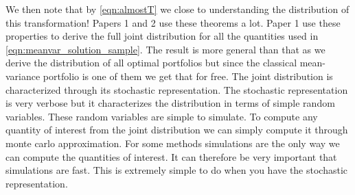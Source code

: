 \documentclass[oneside]{book}\usepackage{knitr}
\begin{document}
We then note that by \eqref{eqn:almostT} we close to understanding the distribution of this transformation! 
Papers 1 and 2 use these theorems a lot.
Paper 1 use these properties to derive the full joint distribution for all the quantities used in \eqref{eqn:meanvar_solution_sample}.
The result is more general than that as we derive the distribution of all optimal portfolios but since the classical mean-variance portfolio is one of them we get that for free. 
The joint distribution is characterized through its stochastic representation.
The stochastic representation is very verbose but it characterizes the distribution in terms of simple random variables.
These random variables are simple to simulate.
To compute any quantity of interest from the joint distribution we can simply compute it through monte carlo approximation. 
For some methods simulations are the only way we can compute the quantities of interest.
It can therefore be very important that simulations are fast.
This is extremely simple to do when you have the stochastic representation.
\end{document}
